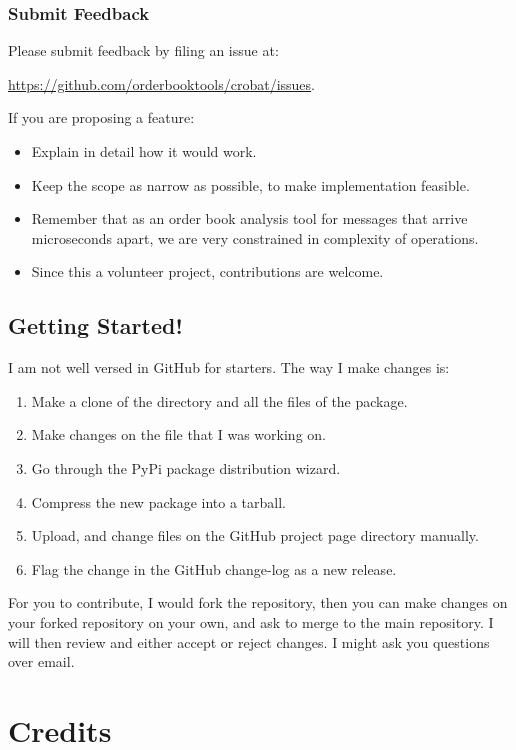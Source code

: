 \documentclass[refman]{article}
\begin{document}
 \subsubsection{Submit Feedback}
 
 Please submit feedback by filing an issue at:
 
 \noindent  \href{https://github.com/orderbooktools/crobat/issues}{https://github.com/orderbooktools/crobat/issues}.
 \smallskip
 
 \noindent If you are proposing a feature:\begin{itemize}
 	\item Explain in detail how it would work.
 	\item Keep the scope as narrow as possible, to make implementation feasible.
 	\item Remember that as an order book analysis tool for messages that arrive microseconds apart, we are very constrained in complexity of operations.
 	\item Since this a volunteer project, contributions are welcome.
 \end{itemize}
  
 \subsection{Getting Started!}
 I am not well versed in GitHub for starters. The way I make changes is:
 \begin{enumerate}
 	\item Make a clone of the directory and all the files of the package. 
 	\item Make changes on the file that I was working on.
 	\item Go through the PyPi package distribution wizard.
 	\item Compress the new package into a tarball.
 	\item Upload, and change files on the GitHub project page directory manually.
 	\item Flag the change in the GitHub change-log as a new release.
 \end{enumerate}

\noindent For you to contribute, I would fork the repository, then you can make changes on your forked repository on your own, and ask to merge to the main repository. I will then review and either accept or reject changes. I might ask you questions over email. 
 \newpage
 \section{Credits}
\end{document}
